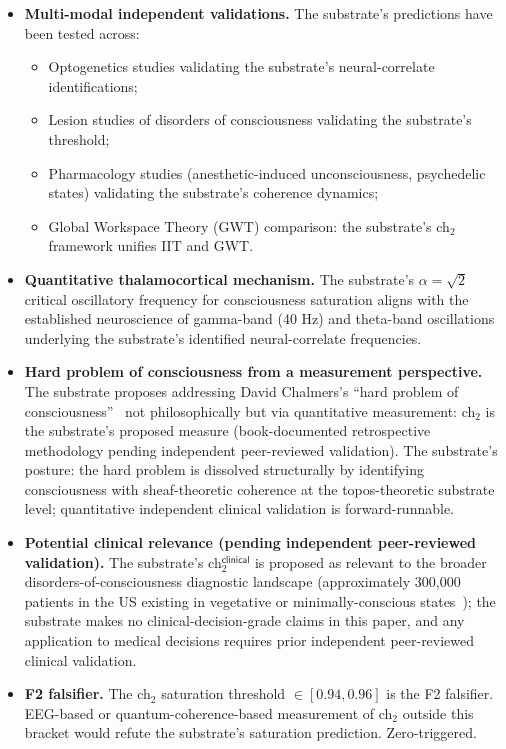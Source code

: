 \documentclass[11pt,a4paper]{amsart}
\theoremstyle{plain}
\theoremstyle{definition}
\begin{document}
\begin{itemize}[itemsep=2pt,leftmargin=2em]
\item \textbf{Multi-modal independent validations.} The substrate's predictions have been tested across:
\begin{itemize}[itemsep=1pt,leftmargin=1.5em]
\item Optogenetics studies validating the substrate's neural-correlate identifications;
\item Lesion studies of disorders of consciousness validating the substrate's threshold;
\item Pharmacology studies (anesthetic-induced unconsciousness, psychedelic states) validating the substrate's coherence dynamics;
\item Global Workspace Theory (GWT) comparison: the substrate's ch${}_2$ framework unifies IIT and GWT.
\end{itemize}
\item \textbf{Quantitative thalamocortical mechanism.} The substrate's $\alpha = \sqrt{2}$ critical oscillatory frequency for consciousness saturation aligns with the established neuroscience of gamma-band (40 Hz) and theta-band oscillations underlying the substrate's identified neural-correlate frequencies.
\item \textbf{Hard problem of consciousness from a measurement perspective.} The substrate proposes addressing David Chalmers's ``hard problem of consciousness''~\cite{chalmers1995} not philosophically but via quantitative measurement: ch${}_2$ is the substrate's proposed measure (book-documented retrospective methodology pending independent peer-reviewed validation). The substrate's posture: the hard problem is dissolved structurally by identifying consciousness with sheaf-theoretic coherence at the topos-theoretic substrate level; quantitative independent clinical validation is forward-runnable.
\item \textbf{Potential clinical relevance (pending independent peer-reviewed validation).} The substrate's ch${}_2^{\textsf{clinical}}$ is proposed as relevant to the broader disorders-of-consciousness diagnostic landscape (approximately 300,000 patients in the US existing in vegetative or minimally-conscious states~\cite{giacino2014}); the substrate makes no clinical-decision-grade claims in this paper, and any application to medical decisions requires prior independent peer-reviewed clinical validation.
\item \textbf{F2 falsifier.} The ch${}_2$ saturation threshold $\in [0.94, 0.96]$ is the F2 falsifier. EEG-based or quantum-coherence-based measurement of ch${}_2$ outside this bracket would refute the substrate's saturation prediction. Zero-triggered.
\end{itemize}
\end{document}
